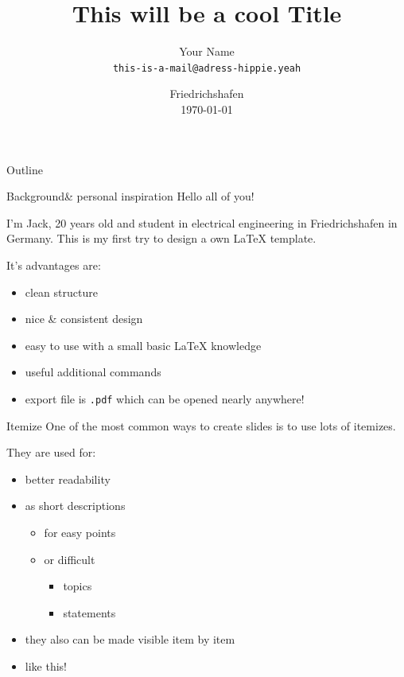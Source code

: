 \documentclass[	12pt, 				
				t,					
				aspectratio=169,
				]{beamer}
\title{This will be a cool Title }
\date{Friedrichshafen\\\today}
\author{Your Name \\\texttt{this-is-a-mail@adress-hippie.yeah}}
\institute{DHBW Ravensburg \\ Campus Friedrichshafen}
\begin{document}
	
	\begin{frame}[noframenumbering]
		\titlepage
	\end{frame}


	\begin{frame}{Outline}
		\tableofcontents
	\end{frame}


	
	
	\begin{frame}{Background}{\& personal inspiration}
		Hello all of you! 
		
		I'm Jack, 20 years old and student in electrical engineering in Friedrichshafen in Germany.
		This is my first try to design a own \LaTeX{} template.
		
		It's advantages are:
		\begin{itemize}
			\item clean structure
			\item nice \& consistent design
			\item easy to use with a small basic \LaTeX{} knowledge
			\item useful additional commands
			\item export file is \texttt{.pdf} which can be opened nearly anywhere!
		\end{itemize}
	\end{frame}
	
	
	
	
	
	\begin{frame}{Itemize}{}
		One of the most common ways to create slides is to use lots of itemizes.
		
		They are used for:
		\begin{itemize}
			\item better readability
			\item as short descriptions
			\begin{itemize}
				\item for easy points
				\item or difficult
				\begin{itemize}
					\item topics
					\item statements
				\end{itemize}
			\end{itemize}
			\item <2-> they also can be made visible item by item
			\item <3-> like this!
		\end{itemize}
	\end{frame}
	
\end{document}

